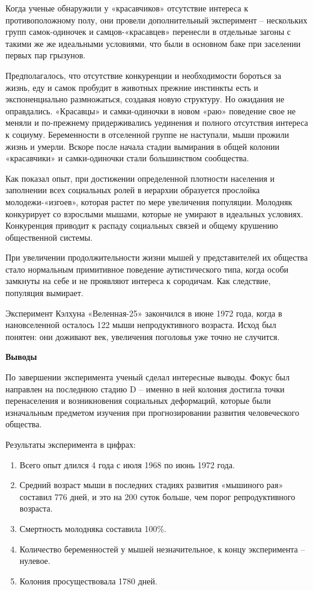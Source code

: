 Когда ученые обнаружили у «красавчиков» отсутствие интереса к противоположному полу, они провели дополнительный эксперимент – нескольких групп самок-одиночек и самцов-«красавцев» перенесли в отдельные загоны с такими же же идеальными условиями, что были в основном баке при заселении первых пар грызунов.

Предполагалось, что отсутствие конкуренции и необходимости бороться за жизнь, еду и самок пробудит в животных прежние инстинкты есть и экспоненциально размножаться, создавая новую структуру. Но ожидания не оправдались. «Красавцы» и самки-одиночки в новом «раю» поведение свое не меняли и по-прежнему придерживались уединения и полного отсутствия интереса к социуму. Беременности в отселенной группе не наступали, мыши прожили жизнь и умерли. Вскоре после начала стадии вымирания в общей колонии «красавчики» и самки-одиночки стали большинством сообщества.

Как показал опыт, при достижении определенной плотности населения и заполнении всех социальных ролей в иерархии образуется прослойка молодежи-«изгоев», которая растет по мере увеличения популяции. Молодняк конкурирует со взрослыми мышами, которые не умирают в идеальных условиях. Конкуренция приводит к распаду социальных связей и общему крушению общественной системы.

При увеличении продолжительности жизни мышей у представителей их общества стало нормальным примитивное поведение аутистического типа, когда особи замкнуты на себе и не проявляют интереса к сородичам. Как следствие, популяция вымирает.

Эксперимент Кэлхуна «Веленная-25» закончился в июне 1972 года, когда в нановселенной осталось 122 мыши непродуктивного возраста. Исход был понятен: они доживают век, увеличения поголовья уже точно не случится.


\textbf{Выводы}

По завершении эксперимента ученый сделал интересные выводы. Фокус был направлен на последнюю стадию D – именно в ней колония достигла точки перенаселения и возникновения социальных деформаций, которые были изначальным предметом изучения при прогнозировании развития человеческого общества.

\begin{fancyquotes}
    Результаты эксперимента в цифрах:

    \begin{enumerate}
        \item Всего опыт длился 4 года с июля 1968 по июнь 1972 года.
        \item Средний возраст мыши в последних стадиях развития «мышиного рая» составил 776 дней, и это на 200 суток больше, чем порог репродуктивного возраста.
        \item Смертность молодняка составила 100\%.
        \item Количество беременностей у мышей незначительное, к концу эксперимента – нулевое.
        \item Колония просуществовала 1780 дней.
    \end{enumerate}
\end{fancyquotes}

